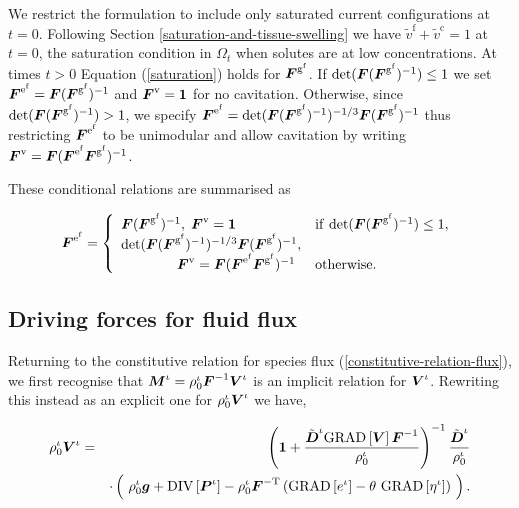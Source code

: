 We restrict the formulation to include only saturated current
configurations at $t = 0$. Following Section
\ref{saturation-and-tissue-swelling} we have $\tilde{v}^\mathrm{f} +
\tilde{v}^\mathrm{c} = 1$ at $t = 0$, the saturation condition in
$\Omega_t$ when solutes are at low concentrations. At times $t > 0$
Equation (\ref{saturation}) holds for
$\mbox{\boldmath$ F$}^{\mathrm{g}^\mathrm{f}}$. If
$\mathrm{det}(\mbox{\boldmath$ F$}(\mbox{\boldmath$ F$}^{\mathrm{g}^\mathrm{f}})^{-1}) \le 1$ we set
$\mbox{\boldmath$ F$}^{\mathrm{e}^\mathrm{f}} = \mbox{\boldmath$ F$}(\mbox{\boldmath$ F$}^{\mathrm{g}^\mathrm{f}})^{-1}$
and $\mbox{\boldmath$ F$}^{\mathrm{v}} = {\bf 1}$ for no cavitation. Otherwise, since
$\mathrm{det}(\mbox{\boldmath$ F$}(\mbox{\boldmath$ F$}^{\mathrm{g}^\mathrm{f}})^{-1}) > 1$, we specify
$\mbox{\boldmath$ F$}^{\mathrm{e}^\mathrm{f}} =
\mathrm{det}(\mbox{\boldmath$ F$}(\mbox{\boldmath$ F$}^{\mathrm{g}^\mathrm{f}})^{-1})^{-1/3}\mbox{\boldmath$ F$}
(\mbox{\boldmath$ F$}^{\mathrm{g}^\mathrm{f}})^{-1}$ thus restricting
$\mbox{\boldmath$ F$}^{\mathrm{e}^\mathrm{f}}$ to be unimodular and allow cavitation by
writing $\mbox{\boldmath$ F$}^{\mathrm{v}} =
\mbox{\boldmath$ F$}(\mbox{\boldmath$ F$}^{\mathrm{e}^\mathrm{f}}\mbox{\boldmath$ F$}^{\mathrm{g}^\mathrm{f}})^{-1}$.

These conditional relations are summarised as

\begin{equation}
\mbox{\boldmath$ F$}^{\mathrm{e}^\mathrm{f}} = \left\{ \begin{array}{ll}
  \mbox{\boldmath$ F$}(\mbox{\boldmath$ F$}^{\mathrm{g}^\mathrm{f}})^{-1},\; \mbox{\boldmath$ F$}^{\mathrm{v}} = {\bf 1}&
  \mathrm{if}\ \mathrm{det}(\mbox{\boldmath$ F$}(\mbox{\boldmath$ F$}^{\mathrm{g}^\mathrm{f}})^{-1}) \le
  1,\\ \mathrm{det}(\mbox{\boldmath$ F$}(\mbox{\boldmath$ F$}^{\mathrm{g}^\mathrm{f}})^{-1})^{-1/3}
  \mbox{\boldmath$ F$}(\mbox{\boldmath$ F$}^{\mathrm{g}^\mathrm{f}})^{-1}, & \\ \qquad\qquad
  \mbox{\boldmath$ F$}^{\mathrm{v}} =
  \mbox{\boldmath$ F$}(\mbox{\boldmath$ F$}^{\mathrm{e}^\mathrm{f}}\mbox{\boldmath$ F$}^{\mathrm{g}^\mathrm{f}})^{-1} &
  \mathrm{otherwise.}
\end{array}\right.
\label{cavitation}
\end{equation}

\subsection{Driving forces for fluid flux}
\label{fluid-flux-constitutive-relationships}

Returning to the constitutive relation for species flux
(\ref{constitutive-relation-flux}), we first recognise that $\mbox{\boldmath$ M$}^\iota
= \rho_0^\iota\mbox{\boldmath$ F$}^{-1}\mbox{\boldmath$ V$}^\iota$ is an implicit relation for
$\mbox{\boldmath$ V$}^\iota$. Rewriting this instead as an explicit one for
$\rho^\iota_0\mbox{\boldmath$ V$}^\iota$ we have,

\begin{eqnarray}
\rho^\iota_0\mbox{\boldmath$ V$}^\iota =& &\left({\bf 1} +
\frac{\tilde{\mbox{\boldmath$ D$}}^\iota\mathrm{GRAD}\left[\mbox{\boldmath$ V$}\right]\mbox{\boldmath$ F$}^{-1}}
     {\rho^\iota_0}\right)^{-1}
     \frac{\tilde{\mbox{\boldmath$ D$}}^\iota}{\rho^\iota_0}\nonumber\\ & &\cdot\left(
     \ \rho_0^\iota\mbox{\boldmath$ g$} + \mathrm{DIV}\left[\mbox{\boldmath$ P$}^\iota\right] -
     \rho^\iota_0\mbox{\boldmath$ F$}^{-\mathrm{T}}\left(\mathrm{GRAD}
     \left[e^\iota\right] -
     \theta\ \mathrm{GRAD}\left[\eta^\iota\right]\right)\ \right).
     \nonumber
\end{eqnarray}

